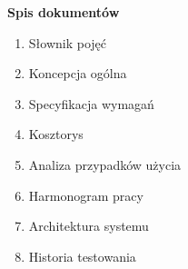 

\begin{center}
\vspace*{5cm}
\end{center}
\clearpage

\vspace*{3cm}
{\textbf{\Large{Spis dokumentów}}}\vspace{1cm}
\large
\begin{enumerate}\itemsep5pt
  \item Słownik pojęć
  \item Koncepcja ogólna
  \item Specyfikacja wymagań
  \item Kosztorys
  \item Analiza przypadków użycia
  \item Harmonogram pracy
  \item Architektura systemu
  \item Historia testowania
\end{enumerate}
\vfill


